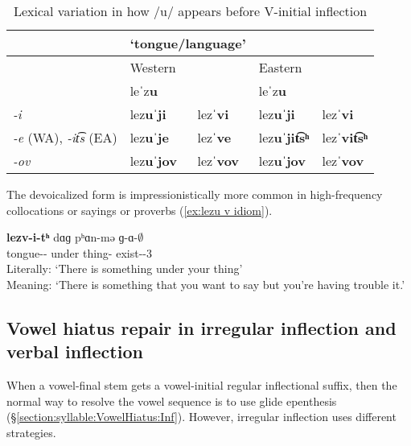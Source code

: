 {	\begin{table}[H]
		\centering
		\caption{Lexical  variation in how /u/ appears before  V-initial inflection}
		\label{tab:vow vowel u inf lexical}
		\begin{tabular}{|l|ll |ll|    }
			\hline 
			&       \multicolumn{2}{l}{ `tongue/language'} & \armenian{լեզու}&  
			\\ 
			\hline  
			& Western && Eastern  &
			\\
			& leˈz\textbf{u}&& leˈz\textbf{u}&
			\\
			{\gendat} \textit{-i} & lez\textbf{uˈji}& lezˈ\textbf{vi}& lez\textbf{uˈji}& lezˈ\textbf{vi}
			\\
			{\abl} \textit{-e} (WA), \textit{-it͡s} (EA)  & lez\textbf{uˈje}& lezˈ\textbf{ve}& lez\textbf{uˈjit͡sʰ}& lezˈ\textbf{vit͡sʰ}
			\\
			{\ins} \textit{-ov}  & lez\textbf{uˈjov}& lezˈ\textbf{vov}& lez\textbf{uˈjov}& lezˈ\textbf{vov}
			\\ \hline 
		\end{tabular}
	\end{table} 
	
	The devoicalized form is impressionistically more common in high-frequency collocations or sayings or proverbs (\ref{ex:lezu v idiom}). 
	
	\begin{exe}
		\ex \gll \textbf{lezv-i-tʰ} dɑɡ pʰɑn-mə ɡ-ɑ-$\emptyset$ \\
		tongue-{\gen}-{\possSsg} under thing-{\indf} exist-{\thgloss}-3{\sg}
		\\
		\trans Literally: `There is something under your thing'
		\\
		Meaning: `There is something that you want to say but you're having trouble  it.' \\
		\label{ex:lezu v idiom}
	\end{exe}
	
	
	
	\subsection{Vowel hiatus repair in irregular inflection and  verbal inflection}\label{section:syllable:VowelHiatus:Irregular}
	When a vowel-final stem gets a vowel-initial regular inflectional suffix, then the normal way to resolve the vowel sequence is to use glide epenthesis (\S\ref{section:syllable:VowelHiatus:Inf}). However, irregular inflection uses different strategies. 
	
}
